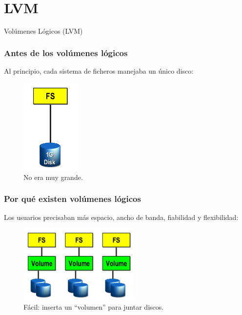 \documentclass{beamer}
\begin{document}

\section{LVM}

\begin{frame}
  \begin{center}
    \Huge{Volúmenes Lógicos (LVM)}
  \end{center}
\end{frame}

\begin{frame}
  \frametitle{Antes de los volúmenes lógicos}
Al principio, cada sistema de ficheros manejaba un único disco:

\begin{figure}[h]
\begin{center}
  \includegraphics[width=3cm]{figs/singledisk.png}
  \caption{{\footnotesize No era muy grande.}}
\end{center}
\end{figure}

\end{frame}


\begin{frame}
  \frametitle{Por qué existen volúmenes lógicos}
Los usuarios precisaban más espacio, ancho de banda, fiabilidad y flexibilidad:

\begin{figure}[h]
\begin{center}
  \includegraphics[width=6cm]{figs/volumes.png}
  \caption{{\footnotesize Fácil: inserta un ``volumen'' para juntar discos.}}
\end{center}
\end{figure}

\end{frame}
\end{document}
